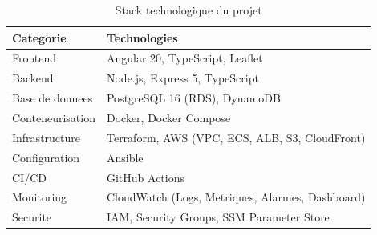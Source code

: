 \begin{table}[H]
    \centering
    \begin{tabularx}{\textwidth}{lX}
        \toprule
        \textbf{Categorie} & \textbf{Technologies} \\
        \midrule
        Frontend & Angular 20, TypeScript, Leaflet \\
        Backend & Node.js, Express 5, TypeScript \\
        Base de donnees & PostgreSQL 16 (RDS), DynamoDB \\
        Conteneurisation & Docker, Docker Compose \\
        Infrastructure & Terraform, AWS (VPC, ECS, ALB, S3, CloudFront) \\
        Configuration & Ansible \\
        CI/CD & GitHub Actions \\
        Monitoring & CloudWatch (Logs, Metriques, Alarmes, Dashboard) \\
        Securite & IAM, Security Groups, SSM Parameter Store \\
        \bottomrule
    \end{tabularx}
    \caption{Stack technologique du projet}
\end{table}
